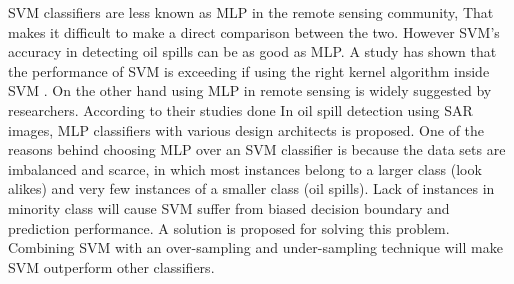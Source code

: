 SVM classifiers are less known as MLP in the remote sensing community, That makes it difficult to make a direct comparison between the two. 
However SVM's accuracy in detecting oil spills can be as good as MLP. A study has shown that the performance of SVM is exceeding if using the right kernel algorithm inside SVM \cite{liu2006boosting}. On the other hand using MLP in remote sensing is widely suggested by researchers\cite{Mera201472,Brekke200595,fingas2014review}. According to their studies done In oil spill detection using SAR images, MLP classifiers with various design architects is proposed. 
One of the reasons behind choosing MLP over an SVM classifier is because the data sets are imbalanced and scarce, in which most instances belong to a larger class (look alikes) and very few instances of a smaller class (oil spills). Lack of instances in minority class will cause SVM suffer from biased decision boundary and prediction performance. A solution is proposed for solving this problem. Combining SVM with an over-sampling and under-sampling technique will make SVM outperform other classifiers\cite{liu2006boosting}.

